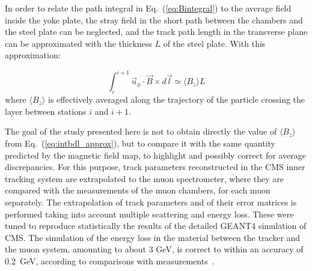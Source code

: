 In order to relate the path integral in Eq.~(\ref{eq:Bintegral}) to the
average field inside the yoke plate, the stray field in the short path
between the chambers and the steel plate can be neglected, and the
track path length in the transverse plane
can be approximated with the thickness $L$ of the steel plate. With this
approximation:

\begin{equation}
  \int^{i+1}_{i}\vec{u}_{\phi}\cdot\vec{B}\times d\vec{l} \simeq \langle B_{z}\rangle L
\label{eq:intbdl_approx}
\end{equation}
where $\langle B_{z}\rangle$ is effectively averaged along the
trajectory of the particle crossing the layer
between stations $i$ and $i+1$.

The goal of the study presented here is not to obtain
directly the value of $\langle B_{z}\rangle$ from
Eq.~(\ref{eq:intbdl_approx}), but to compare it with the same quantity
predicted
by the magnetic field map, to highlight and possibly correct for
average discrepancies.
For this purpose, track parameters reconstructed in the CMS inner
tracking system are extrapolated to the muon spectrometer, where they are
compared with the measurements of the muon chambers, for each muon separately.
The extrapolation of track parameters and of their error matrices
is performed taking into account multiple scattering and energy
loss. These were tuned to reproduce statistically the results of the
detailed GEANT4 simulation of CMS.
The simulation of the energy loss in the material between
the tracker and the muon system, amounting to about 3 GeV,
is correct to within an accuracy of 0.2~GeV, according to comparisons
with measurements~\cite{ThesisBianchini}.

